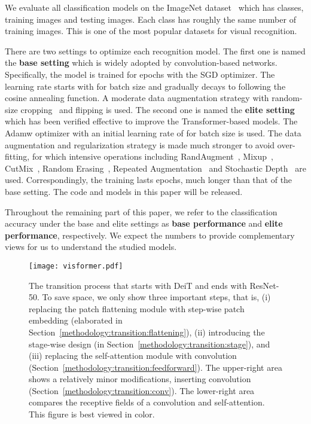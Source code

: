 \documentclass[10pt,twocolumn,letterpaper]{article}
\begin{document}
We evaluate all classification models on the ImageNet dataset~\cite{russakovsky2015imagenet} which has  classes,  training images and  testing images. Each class has roughly the same number of training images. This is one of the most popular datasets for visual recognition.

There are two settings to optimize each recognition model. The first one is named the \textbf{base setting} which is widely adopted by convolution-based networks. Specifically, the model is trained for  epochs with the SGD optimizer. The learning rate starts with  for batch size  and gradually decays to  following the cosine annealing function. A moderate data augmentation strategy with random-size cropping~\cite{szegedy2016rethinking} and flipping is used. The second one is named the \textbf{elite setting} which has been verified effective to improve the Transformer-based models. The Adamw optimizer with an initial learning rate of  for batch size  is used. The data augmentation and regularization strategy is made much stronger to avoid over-fitting, for which intensive operations including RandAugment~\cite{cubuk2020randaugment}, Mixup~\cite{Zhang2017mixup}, CutMix~\cite{yun2019cutmix}, Random Erasing~\cite{zhong2020random}, Repeated Augmentation~\cite{berman2019multigrain,hoffer2020augment} and Stochastic Depth~\cite{huang2016deep} are used. Correspondingly, the training lasts  epochs, much longer than that of the base setting. The code and models in this paper will be released.

Throughout the remaining part of this paper, we refer to the classification accuracy under the base and elite settings as \textbf{base performance} and \textbf{elite performance}, respectively. We expect the numbers to provide complementary views for us to understand the studied models.

\begin{figure*}[t]
\begin{center}
\texttt{[image: visformer.pdf]}
\end{center}
\caption{The transition process that starts with DeiT and ends with ResNet-50. To save space, we only show three important steps, that is, (i) replacing the patch flattening module with step-wise patch embedding (elaborated in Section~\ref{methodology:transition:flattening}), (ii) introducing the stage-wise design (in Section~\ref{methodology:transition:stage}), and (iii) replacing the self-attention module with convolution (Section~\ref{methodology:transition:feedforward}). The upper-right area shows a relatively minor modifications, inserting  convolution (Section~\ref{methodology:transition:conv}). The lower-right area compares the receptive fields of a  convolution and self-attention. This figure is best viewed in color.}
\label{fig:transition}
\end{figure*}
\end{document}
